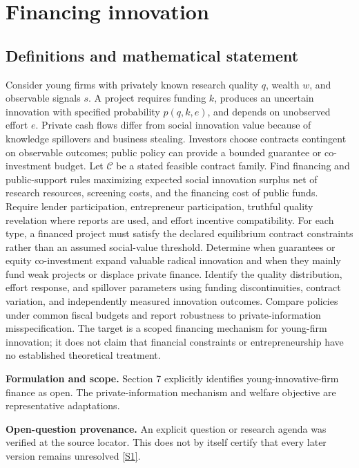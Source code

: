 \documentclass[11pt]{article}
\newcommand{\sref}[2]{\hyperlink{source:#1:#2}{[S#2]}}
\begin{document}
\section*{Financing innovation}\label{30007548}
\subsection{Definitions and mathematical statement}
Consider young firms with privately known research quality \(q\), wealth \(w\), and observable signals \(s\). A project requires funding \(k\), produces an uncertain innovation with specified probability \(p(q,k,e)\), and depends on unobserved effort \(e\). Private cash flows differ from social innovation value because of knowledge spillovers and business stealing. Investors choose contracts contingent on observable outcomes; public policy can provide a bounded guarantee or co-investment budget. Let \(\mathcal C\) be a stated feasible contract family.
Find financing and public-support rules maximizing expected social innovation surplus net of research resources, screening costs, and the financing cost of public funds. Require lender participation, entrepreneur participation, truthful quality revelation where reports are used, and effort incentive compatibility. For each type, a financed project must satisfy the declared equilibrium contract constraints rather than an assumed social-value threshold.
Determine when guarantees or equity co-investment expand valuable radical innovation and when they mainly fund weak projects or displace private finance. Identify the quality distribution, effort response, and spillover parameters using funding discontinuities, contract variation, and independently measured innovation outcomes. Compare policies under common fiscal budgets and report robustness to private-information misspecification. The target is a scoped financing mechanism for young-firm innovation; it does not claim that financial constraints or entrepreneurship have no established theoretical treatment.

\par\textbf{Formulation and scope.} Section 7 explicitly identifies young-innovative-firm finance as open. The private-information mechanism and welfare objective are representative adaptations.

\par\textbf{Open-question provenance.} An explicit question or research agenda was verified at the source locator. This does not by itself certify that every later version remains unresolved \sref{30007548}{1}.
\end{document}
